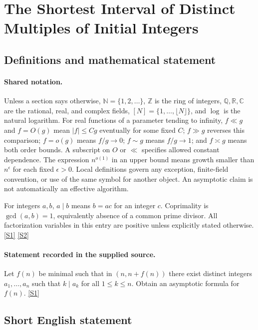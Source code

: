 \documentclass[11pt,a4paper]{article}
\newcommand{\N}{\mathbb{N}}
\newcommand{\Z}{\mathbb{Z}}
\newcommand{\Q}{\mathbb{Q}}
\newcommand{\R}{\mathbb{R}}
\newcommand{\C}{\mathbb{C}}
\newcommand{\sref}[2]{\hyperlink{source:#1:#2}{[S#2]}}
\begin{document}
\section{The Shortest Interval of Distinct Multiples of Initial Integers}\label{statement}


\subsection{Definitions and mathematical statement}

\paragraph{Shared notation.}Unless a section says otherwise, $\N=\{1,2,\ldots\}$,
$\Z$ is the ring of integers, $\Q,\R,\C$ are the rational, real, and complex
fields, $[N]=\{1,\ldots,\lfloor N\rfloor\}$, and $\log$ is the natural
logarithm. For real functions of a parameter tending to infinity,
$f\ll g$ and $f=O(g)$ mean $|f|\leq Cg$ eventually for some fixed $C$;
$f\gg g$ reverses this comparison; $f=o(g)$ means $f/g\to0$;
$f\sim g$ means $f/g\to1$; and $f\asymp g$ means both order bounds.
A subscript on $O$ or $\ll$ specifies allowed constant dependence.
The expression $n^{o(1)}$ in an upper bound means growth smaller than
$n^\epsilon$ for each fixed $\epsilon>0$. Local definitions govern any
exception, finite-field convention, or use of the same symbol for another
object. An asymptotic claim is not automatically an effective algorithm.



For integers $a,b$, $a\mid b$ means $b=ac$ for an integer $c$. Coprimality is $\gcd(a,b)=1$, equivalently absence of a common prime divisor. All factorization variables in this entry are positive unless explicitly stated otherwise. \sref{statement}{1} \sref{statement}{2}

\paragraph{Statement recorded in the supplied source.}
Let $f(n)$ be minimal such that in $(n,n+f(n))$ there exist distinct integers $a_1,\ldots,a_n$ such that $k\mid a_k$ for all $1\leq k\leq n$. Obtain an asymptotic formula for $f(n)$. \sref{statement}{1}

\subsection{Short English statement}
\end{document}
